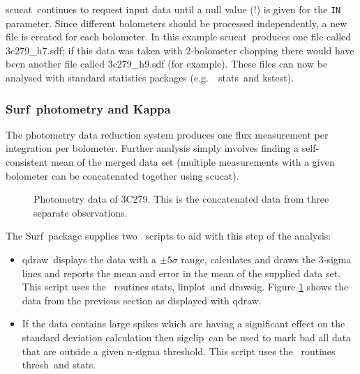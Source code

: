 \documentclass[twoside,11pt]{article}
\newcommand{\scusoft}          {{\sc Surf}}
\newcommand{\Kappa}{\xref{{\sc{Kappa}}}{sun95}{}}
\newcommand{\task}[1]{{\sf #1}}
\newcommand{\param}[1]{{\tt #1}}
\newcommand{\scucat}{\htmlref{\task{scucat}}{SCUCAT}}
\newcommand{\qdraw}{\htmlref{\task{qdraw}}{QDRAW}}
\newcommand{\sigclip}{\htmlref{\task{sigclip}}{SIGCLIP}}
\newcommand{\linplot}{\xref{\task{linplot}}{sun95}{LINPLOT}}
\newcommand{\drawsig}{\xref{\task{drawsig}}{sun95}{DRAWSIG}}
\newcommand{\kstest}{\xref{\task{kstest}}{sun95}{KSTEST}}
\newcommand{\stats}{\xref{\task{stats}}{sun95}{STATS}}
\newcommand{\thresh}{\xref{\task{thresh}}{sun95}{THRESH}}
\newcommand{\htmlref}[2]{#1}
\newcommand{\xref}[3]{#1}
\begin{document}
\scucat\ continues to request input data until a null value (!) is given for
the \param{IN} parameter. Since different bolometers should be processed
independently, a new file is created for each bolometer. In this example
\scucat\ produces one file called 3c279\_h7.sdf; if this data was taken with
2-bolometer chopping there would have been another file called 3c279\_h9.sdf
(for example). These files can now be analysed with standard statistics
packages (e.g.\ \Kappa\ \stats\ and \kstest).

\subsubsection{\scusoft\ photometry and \xref{{\sc Kappa}}{sun95}{}}

The photometry data reduction system produces one flux measurement per
integration per bolometer. Further analysis simply involves finding a
self-consistent mean of the merged data set (multiple measurements with a
given bolometer can be concatenated together using \scucat).

\begin{figure}
\begin{center}
\caption{Photometry data of 3C279. This is the concatenated data from three
separate observations.}
\label{qdrawfig}
\end{center}
\end{figure}

The \scusoft\ package supplies two \Kappa\ scripts to aid with this step of
the analysis:

\begin{itemize}

\item  \qdraw\ displays the data with a $\pm 5\sigma$ range,
calculates and draws the 3-sigma lines and reports the mean and error in the
mean of the supplied data set. This script uses the \Kappa\ routines
\stats, \linplot\ and \drawsig. Figure \ref{qdrawfig}
shows the data from the previous section as displayed with \qdraw.

\item If the data contains large spikes which are having a significant effect
on the standard deviation calculation then \sigclip\ can be used to mark
bad all data that are outside a given n-sigma threshold. This script uses the
\Kappa\ routines \thresh\ and \stats.

\end{itemize}
\end{document}
